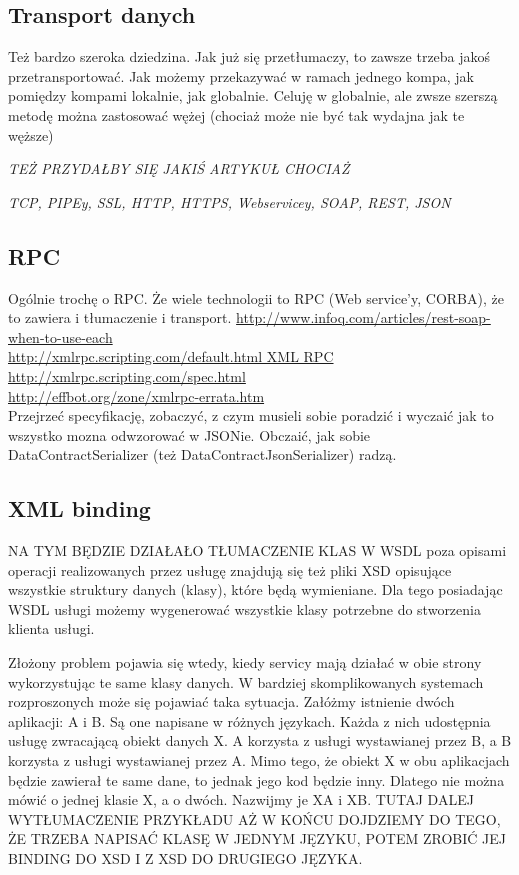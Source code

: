 \documentclass[twoside,a4paper]{book}
\begin{document}
\subsection{Transport danych}
Też bardzo szeroka dziedzina. Jak już się przetłumaczy, to zawsze trzeba jakoś przetransportować. Jak możemy przekazywać w ramach jednego kompa, jak pomiędzy kompami lokalnie, jak globalnie.
Celuję w globalnie, ale zwsze szerszą metodę można zastosować wężej (chociaż może nie być tak wydajna jak te węższe)

\emph{TEŻ PRZYDAŁBY SIĘ JAKIŚ ARTYKUŁ CHOCIAŻ}

\emph{TCP, PIPEy, SSL, HTTP, HTTPS, Webservicey, SOAP, REST, JSON}

\subsection{RPC}
Ogólnie trochę o RPC. Że wiele technologii to RPC (Web service'y, CORBA), że to zawiera i tłumaczenie i transport.
\url{http://www.infoq.com/articles/rest-soap-when-to-use-each}\\

\url{http://xmlrpc.scripting.com/default.html XML RPC}\\
\url{http://xmlrpc.scripting.com/spec.html}\\
\url{http://effbot.org/zone/xmlrpc-errata.htm}\\
Przejrzeć specyfikację, zobaczyć, z czym musieli sobie poradzić i wyczaić jak to wszystko mozna odwzorować w JSONie. Obczaić, jak sobie DataContractSerializer (też DataContractJsonSerializer) radzą. 

\subsection{XML binding}
NA TYM BĘDZIE DZIAŁAŁO TŁUMACZENIE KLAS
W WSDL poza opisami operacji realizowanych przez usługę znajdują się też pliki XSD opisujące wszystkie struktury danych (klasy), które będą wymieniane. Dla tego posiadając WSDL usługi możemy wygenerować wszystkie klasy potrzebne do stworzenia klienta usługi.

Złożony problem pojawia się wtedy, kiedy servicy mają działać w obie strony wykorzystując te same klasy danych. W bardziej skomplikowanych systemach rozproszonych może się pojawiać taka sytuacja. Załóżmy istnienie dwóch aplikacji: A i B. Są one napisane w różnych językach. Każda z nich udostępnia usługę zwracającą obiekt danych X. A korzysta z usługi wystawianej przez B, a B korzysta z usługi wystawianej przez A. Mimo tego, że obiekt X w obu aplikacjach będzie zawierał te same dane, to jednak jego kod będzie inny. Dlatego nie można mówić o jednej klasie X, a o dwóch. Nazwijmy je XA i XB. TUTAJ DALEJ WYTŁUMACZENIE PRZYKŁADU AŻ W KOŃCU DOJDZIEMY DO TEGO, ŻE TRZEBA NAPISAĆ KLASĘ W JEDNYM JĘZYKU, POTEM ZROBIĆ JEJ BINDING DO XSD I Z XSD DO DRUGIEGO JĘZYKA. 
\end{document}
